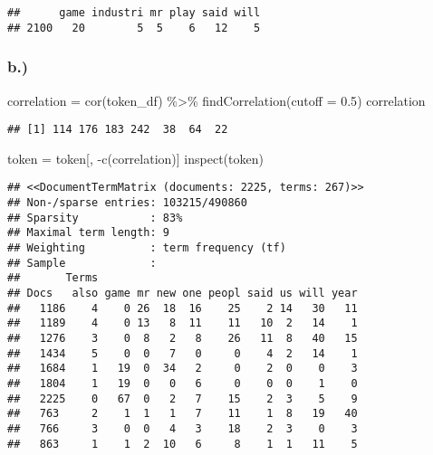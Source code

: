 \documentclass[
]{article}
\newenvironment{Shaded}{\begin{snugshade}}{\end{snugshade}}
\newcommand{\AttributeTok}[1]{\textcolor[rgb]{0.77,0.63,0.00}{#1}}
\newcommand{\FloatTok}[1]{\textcolor[rgb]{0.00,0.00,0.81}{#1}}
\newcommand{\FunctionTok}[1]{\textcolor[rgb]{0.00,0.00,0.00}{#1}}
\newcommand{\NormalTok}[1]{#1}
\newcommand{\OtherTok}[1]{\textcolor[rgb]{0.56,0.35,0.01}{#1}}
\newcommand{\SpecialCharTok}[1]{\textcolor[rgb]{0.00,0.00,0.00}{#1}}
\begin{document}
\begin{verbatim}
##      game industri mr play said will
## 2100   20        5  5    6   12    5
\end{verbatim}

\hypertarget{b.-3}{%
\subsubsection{b.)}\label{b.-3}}

\begin{Shaded}
\begin{Highlighting}[]
\NormalTok{correlation }\OtherTok{=} \FunctionTok{cor}\NormalTok{(token\_df) }\SpecialCharTok{\%\textgreater{}\%} 
  \FunctionTok{findCorrelation}\NormalTok{(}\AttributeTok{cutoff =} \FloatTok{0.5}\NormalTok{)}
\NormalTok{correlation}
\end{Highlighting}
\end{Shaded}

\begin{verbatim}
## [1] 114 176 183 242  38  64  22
\end{verbatim}

\begin{Shaded}
\begin{Highlighting}[]
\NormalTok{token }\OtherTok{=}\NormalTok{ token[, }\SpecialCharTok{{-}}\FunctionTok{c}\NormalTok{(correlation)]}
\FunctionTok{inspect}\NormalTok{(token)}
\end{Highlighting}
\end{Shaded}

\begin{verbatim}
## <<DocumentTermMatrix (documents: 2225, terms: 267)>>
## Non-/sparse entries: 103215/490860
## Sparsity           : 83%
## Maximal term length: 9
## Weighting          : term frequency (tf)
## Sample             :
##       Terms
## Docs   also game mr new one peopl said us will year
##   1186    4    0 26  18  16    25    2 14   30   11
##   1189    4    0 13   8  11    11   10  2   14    1
##   1276    3    0  8   2   8    26   11  8   40   15
##   1434    5    0  0   7   0     0    4  2   14    1
##   1684    1   19  0  34   2     0    2  0    0    3
##   1804    1   19  0   0   6     0    0  0    1    0
##   2225    0   67  0   2   7    15    2  3    5    9
##   763     2    1  1   1   7    11    1  8   19   40
##   766     3    0  0   4   3    18    2  3    0    3
##   863     1    1  2  10   6     8    1  1   11    5
\end{verbatim}
\end{document}
